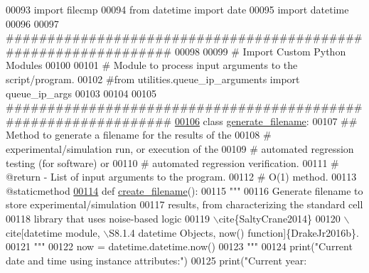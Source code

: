 \begin{DoxyCode}
00093 \textcolor{keyword}{import} filecmp
00094 \textcolor{keyword}{from} datetime \textcolor{keyword}{import} date
00095 \textcolor{keyword}{import} datetime
00096 
00097 \textcolor{comment}{###############################################################}
00098 
00099 \textcolor{comment}{#   Import Custom Python Modules}
00100 
00101 \textcolor{comment}{# Module to process input arguments to the script/program.}
00102 \textcolor{comment}{#from utilities.queue\_ip\_arguments import queue\_ip\_args}
00103 
00104 
00105 \textcolor{comment}{###############################################################}
\hypertarget{generate__results__filename_8py_source_l00106}{}\hyperlink{classutilities_1_1generate__results__filename_1_1generate__filename}{00106} \textcolor{keyword}{class }\hyperlink{classutilities_1_1generate__results__filename_1_1generate__filename}{generate\_filename}:
00107     \textcolor{comment}{##  Method to generate a filename for the results of the}
00108     \textcolor{comment}{#       experimental/simulation run, or execution of the}
00109     \textcolor{comment}{#       automated regression testing (for software) or}
00110     \textcolor{comment}{#       automated regression verification.}
00111     \textcolor{comment}{#   @return - List of input arguments to the program.}
00112     \textcolor{comment}{#   O(1) method.}
00113     @staticmethod
\hypertarget{generate__results__filename_8py_source_l00114}{}\hyperlink{classutilities_1_1generate__results__filename_1_1generate__filename_a9856498ab965f56a941ff46415b48906}{00114}     \textcolor{keyword}{def }\hyperlink{classutilities_1_1generate__results__filename_1_1generate__filename_a9856498ab965f56a941ff46415b48906}{create\_filename}():
00115         \textcolor{stringliteral}{"""}
00116 \textcolor{stringliteral}{            Generate filename to store experimental/simulation}
00117 \textcolor{stringliteral}{                results, from characterizing the standard cell}
00118 \textcolor{stringliteral}{                library that uses noise-based logic}
00119 \textcolor{stringliteral}{                \(\backslash\)cite\{SaltyCrane2014\}}
00120 \textcolor{stringliteral}{                \(\backslash\)cite[datetime module, \(\backslash\)S8.1.4 datetime Objects, now() function]\{DrakeJr2016b\}.}
00121 \textcolor{stringliteral}{        """}
00122         now = datetime.datetime.now()
00123         \textcolor{stringliteral}{"""}
00124 \textcolor{stringliteral}{        print("Current date and time using instance attributes:")}
00125 \textcolor{stringliteral}{        print("Current year: %
}
\end{DoxyCode}
